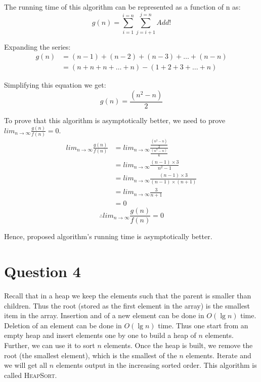 \documentclass[11pt]{article}
\begin{document}
\begin{enumerate}[(a)]
	\begin{algorithm}[H]
		\SetAlgoLined
	\end{algorithm}

	The running time of this algorithm can be represented as a function of n as:
	\begin{equation}
		g(n) = \sum_{i=1}^{i=n} {\sum_{j=i+1}^{j=n} {Add!}}
	\end{equation}
	
	Expanding the series:
	\begin{equation}
	\begin{split}
		g(n) & = (n-1) + (n-2) + (n-3) + \ldots + (n-n) \\
		& = (n + n + n + \ldots + n) - (1 + 2 + 3 + \ldots + n)
	\end{split}
	\end{equation}
	
	Simplifying this equation we get:
	\begin{equation}
		g(n) = \frac{(n^2 - n)}{2}
	\end{equation}
	
	To prove that this algorithm is asymptotically better, we need to prove $lim_{n\to\infty} \frac{g(n)}{f(n)} = 0$.
	\begin{equation}
	\begin{split}
		lim_{n\to\infty} \frac{g(n)}{f(n)} & = lim_{n\to\infty} {\frac{\frac{(n^2 - n)}{2}}{\frac{(n^3 - n)}{6}}} \\
		& = lim_{n\to\infty} {\frac{(n - 1) \times 3}{n^2 - 1}} \\
		& = lim_{n\to\infty} {\frac{(n - 1) \times 3}{(n - 1) \times (n + 1)}} \\
		& = lim_{n\to\infty} {\frac{3}{n + 1}} \\
		& = 0
	\end{split}
	\end{equation}
	\begin{equation}
		\therefore lim_{n\to\infty} \frac{g(n)}{f(n)} = 0
	\end{equation}

	Hence, proposed algorithm's running time is asymptotically better.
\end{enumerate}

\section{Question 4} Recall that in a heap we keep the elements such that the parent is smaller than children. Thus the root (stored as the first element in the array) is the smallest item in the array. Insertion and of a new element can be done in $O(\lg n)$ time. Deletion of an element can be done in $O(\lg n)$ time. Thus one start from an empty heap and insert elements one by one to build a heap of $n$ elements. Further, we can use it to sort $n$ elements. Once the heap is built, we remove the root (the smallest element), which is the smallest of the $n$ elements. Iterate and we will get all $n$ elements output in the increasing sorted order.  This algorithm is called  \textsc{HeapSort}.
 
\end{document}
